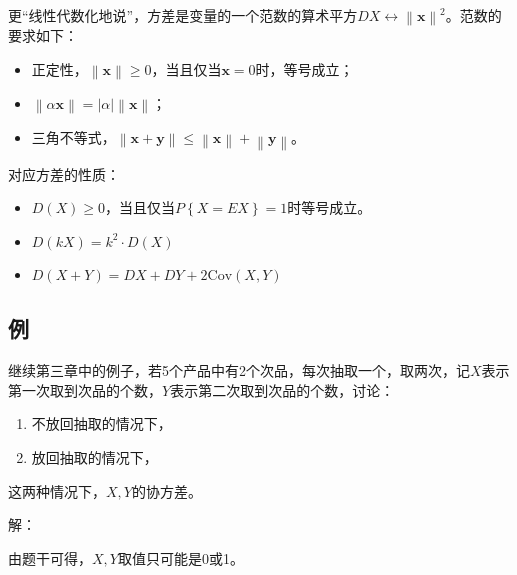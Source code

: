 更“线性代数化地说”，方差是变量的一个范数的算术平方$DX\leftrightarrow \left\| \boldsymbol{x} \right\| ^2$。范数的要求如下：
\begin{itemize}
    \item 正定性，$\left\| \boldsymbol{x} \right\| \geqslant 0$，当且仅当$\boldsymbol{x}=0$时，等号成立；
    \item $\left\| \alpha \boldsymbol{x} \right\| =\left| \alpha \right|\left\| \boldsymbol{x} \right\| $；
    \item 三角不等式，$\left\| \boldsymbol{x}+\boldsymbol{y} \right\| \leqslant \left\| \boldsymbol{x} \right\| +\left\| \boldsymbol{y} \right\| $。
\end{itemize}
对应方差的性质：
\begin{itemize}
    \item $D\left( X \right) \geqslant 0$，当且仅当$P\left\{ X=EX \right\} =1$时等号成立。
    \item $D\left( kX \right) =k^2\cdot D\left( X \right) $
    \item $D\left( X+Y \right) =DX+DY+2\mathrm{Cov}\left( X,Y \right) $
\end{itemize}

\subsection{例}

\begin{example}
继续第三章中的例子，若5个产品中有2个次品，每次抽取一个，取两次，记$X$表示第一次取到次品的个数，$Y$表示第二次取到次品的个数，讨论：
\begin{enumerate}
    \item 不放回抽取的情况下，
    \item 放回抽取的情况下，
\end{enumerate}
这两种情况下，$X,Y$的协方差。
\end{example}

解：

由题干可得，$X,Y$取值只可能是0或1。

